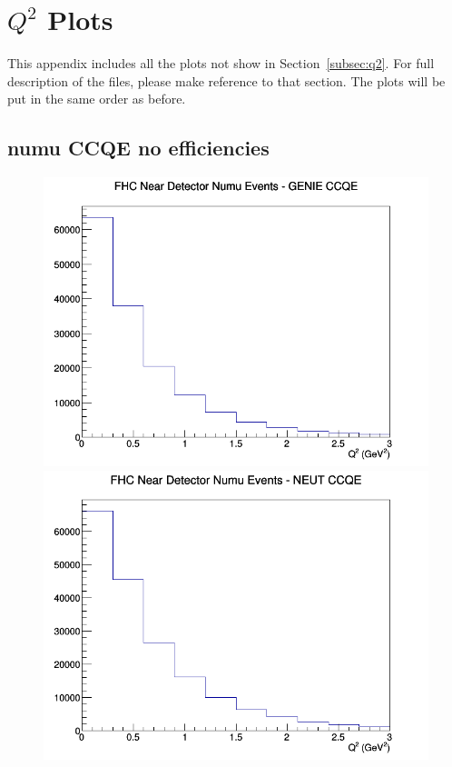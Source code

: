 \section{$Q^2$ Plots}
\label{app:Q2_app}
This appendix includes all the plots not show in Section~\ref{subsec:q2}. For full description of the files, please make reference to that section. The plots will be put in the same order as before.
\subsection{numu CCQE no efficiencies}
\begin{figure}[h]
\includegraphics[width=\linewidth]{Q2/nominal/CCQE_FHC_ND_numu_Q2_GENIE.png}
\endminipage
{}
\includegraphics[width=\linewidth]{Q2/nominal/CCQE_FHC_ND_numu_Q2_NEUT.png}

\end{figure}
